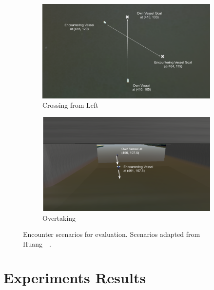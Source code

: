 \begin{figure}[H]
        \begin{subfigure}[b]{0.495\textwidth}
            \centering
            \includegraphics[width=\textwidth]{figs/Chap5/simulation_uwsim_crossingleft_starting_pos.png}
            \caption{Crossing from Left}
            \label{fig:simulation_uwsim_crossingleft_starting_pos}
        \end{subfigure}
        \begin{subfigure}[b]{0.495\textwidth}
            \centering
            \includegraphics[width=\textwidth]{figs/Chap5/simulation_uwsim_overtake_starting_pos.png}
            \caption{Overtaking}
            \label{fig:simulation_uwsim_overtake_starting_pos}
        \end{subfigure}
    
    \caption{Encounter scenarios for evaluation. Scenarios adapted from Huang~\etal{}~\cite{Huang2019Generalized}.}
    \label{fig:simulation_uwsim_encounters}
    \end{figure}
    
    \section{Experiments Results}

